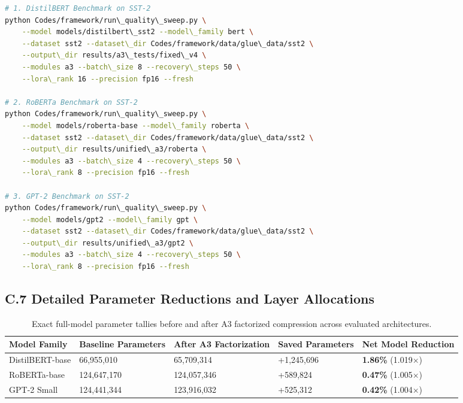 \begin{lstlisting}[language=bash]
# 1. DistilBERT Benchmark on SST-2
python Codes/framework/run\_quality\_sweep.py \
    --model models/distilbert\_sst2 --model\_family bert \
    --dataset sst2 --dataset\_dir Codes/framework/data/glue\_data/sst2 \
    --output\_dir results/a3\_tests/fixed\_v4 \
    --modules a3 --batch\_size 8 --recovery\_steps 50 \
    --lora\_rank 16 --precision fp16 --fresh

# 2. RoBERTa Benchmark on SST-2
python Codes/framework/run\_quality\_sweep.py \
    --model models/roberta-base --model\_family roberta \
    --dataset sst2 --dataset\_dir Codes/framework/data/glue\_data/sst2 \
    --output\_dir results/unified\_a3/roberta \
    --modules a3 --batch\_size 4 --recovery\_steps 50 \
    --lora\_rank 8 --precision fp16 --fresh

# 3. GPT-2 Benchmark on SST-2
python Codes/framework/run\_quality\_sweep.py \
    --model models/gpt2 --model\_family gpt \
    --dataset sst2 --dataset\_dir Codes/framework/data/glue\_data/sst2 \
    --output\_dir results/unified\_a3/gpt2 \
    --modules a3 --batch\_size 4 --recovery\_steps 50 \
    --lora\_rank 8 --precision fp16 --fresh
\end{lstlisting}

\subsection{C.7 Detailed Parameter Reductions and Layer Allocations}
\label{sec:app_full_parameters}

\begin{table}[H]
\centering
\small
\begin{tabular}{lllll}
\toprule
\textbf{Model Family} & \textbf{Baseline Parameters} & \textbf{After A3 Factorization} & \textbf{Saved Parameters} & \textbf{Net Model Reduction} \\
\midrule
DistilBERT-base & 66,955,010 & 65,709,314 & +1,245,696 & \textbf{1.86\%} (1.019$\times$) \\
RoBERTa-base    & 124,647,170 & 124,057,346 & +589,824 & \textbf{0.47\%} (1.005$\times$) \\
GPT-2 Small     & 124,441,344 & 123,916,032 & +525,312 & \textbf{0.42\%} (1.004$\times$) \\
\bottomrule
\end{tabular}
\caption{Exact full-model parameter tallies before and after A3 factorized compression across evaluated architectures.}
\label{tab:app_full_param_counts}
\end{table}


